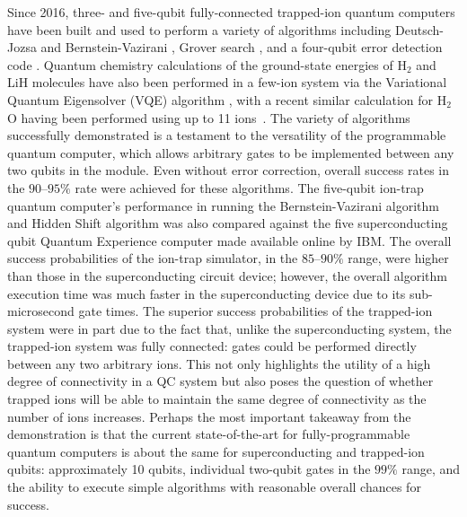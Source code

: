 \documentclass[%
reprint,
 amsmath,amssymb,
]{revtex4-1}
\begin{document}
Since 2016, three- and five-qubit fully-connected trapped-ion quantum computers have been built \cite{Debnath5QubitComp2016} and used to perform a variety of algorithms including Deutsch-Jozsa and Bernstein-Vazirani \cite{Debnath5QubitComp2016}, Grover search \cite{FiggattGroverSearch2017}, and a four-qubit error detection code \cite{LinkeErrorDetection2017}. Quantum chemistry calculations of the ground-state energies of $\textrm{H}_2$ and LiH molecules have also been performed in a few-ion system via the Variational Quantum Eigensolver (VQE) algorithm \cite{HempelVQE2018}, with a recent similar calculation for H$_{2}$O having been performed using up to 11 ions~\cite{NamWaterMolecule2019}. The variety of algorithms successfully demonstrated is a testament to the versatility of the programmable quantum computer, which allows arbitrary gates to be implemented between any two qubits in the module. Even without error correction, overall success rates in the $90$--$95\%$ rate were achieved for these algorithms. The five-qubit ion-trap quantum computer's performance in running the Bernstein-Vazirani algorithm and Hidden Shift algorithm was also compared against the five superconducting qubit Quantum Experience computer \cite{IBMQuantumExperience} made available online by IBM. The overall success probabilities of the ion-trap simulator, in the $85$--$90 \%$ range, were higher than those in the superconducting circuit device; however, the overall algorithm execution time was much faster in the superconducting device due to its sub-microsecond gate times. The superior success probabilities of the trapped-ion system were in part due to the fact that, unlike the superconducting system, the trapped-ion system was fully connected: gates could be performed directly between any two arbitrary ions. This not only highlights the utility of a high degree of connectivity in a QC system but also poses the question of whether trapped ions will be able to maintain the same degree of connectivity as the number of ions increases. Perhaps the most important takeaway from the demonstration is that the current state-of-the-art for fully-programmable quantum computers is about the same for superconducting and trapped-ion qubits: approximately 10 qubits, individual two-qubit gates in the $99\%$ range, and the ability to execute simple algorithms with reasonable overall chances for success.
\end{document}
